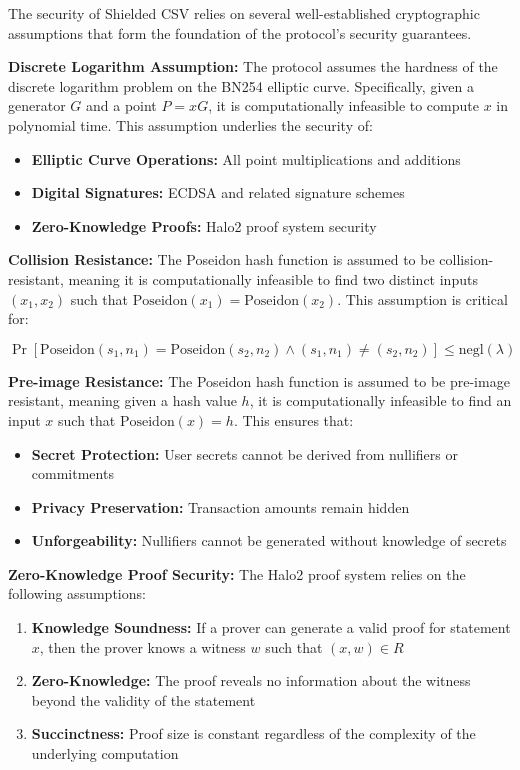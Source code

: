 \documentclass[11pt,a4paper]{article}
\begin{document}
The security of Shielded CSV relies on several well-established cryptographic assumptions that form the foundation of the protocol's security guarantees.

\textbf{Discrete Logarithm Assumption:}
The protocol assumes the hardness of the discrete logarithm problem on the BN254 elliptic curve. Specifically, given a generator $G$ and a point $P = xG$, it is computationally infeasible to compute $x$ in polynomial time. This assumption underlies the security of:

\begin{itemize}
    \item \textbf{Elliptic Curve Operations:} All point multiplications and additions
    \item \textbf{Digital Signatures:} ECDSA and related signature schemes
    \item \textbf{Zero-Knowledge Proofs:} Halo2 proof system security
\end{itemize}

\textbf{Collision Resistance:}
The Poseidon hash function is assumed to be collision-resistant, meaning it is computationally infeasible to find two distinct inputs $(x_1, x_2)$ such that $\text{Poseidon}(x_1) = \text{Poseidon}(x_2)$. This assumption is critical for:

\begin{equation}
\Pr[\text{Poseidon}(s_1, n_1) = \text{Poseidon}(s_2, n_2) \land (s_1, n_1) \neq (s_2, n_2)] \leq \text{negl}(\lambda)
\end{equation}

\textbf{Pre-image Resistance:}
The Poseidon hash function is assumed to be pre-image resistant, meaning given a hash value $h$, it is computationally infeasible to find an input $x$ such that $\text{Poseidon}(x) = h$. This ensures that:

\begin{itemize}
    \item \textbf{Secret Protection:} User secrets cannot be derived from nullifiers or commitments
    \item \textbf{Privacy Preservation:} Transaction amounts remain hidden
    \item \textbf{Unforgeability:} Nullifiers cannot be generated without knowledge of secrets
\end{itemize}

\textbf{Zero-Knowledge Proof Security:}
The Halo2 proof system relies on the following assumptions:

\begin{enumerate}
    \item \textbf{Knowledge Soundness:} If a prover can generate a valid proof for statement $x$, then the prover knows a witness $w$ such that $(x, w) \in R$
    \item \textbf{Zero-Knowledge:} The proof reveals no information about the witness beyond the validity of the statement
    \item \textbf{Succinctness:} Proof size is constant regardless of the complexity of the underlying computation
\end{enumerate}
\end{document}
